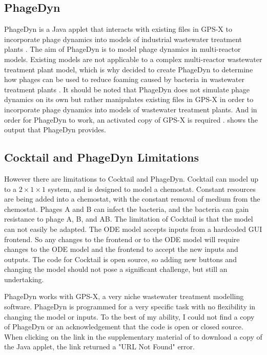 \subsection{PhageDyn}
PhageDyn is a Java applet that interacts with existing files in GPS-X \cite{AdvancedWastewaterModelling} to incorporate phage dynamics into models of industrial wastewater treatment plants \cite{krysiak-baltynSimulationPhageDynamics2017}. 
The aim of PhageDyn is to model phage dynamics in multi-reactor models. 
Existing models are not applicable to a complex multi-reactor wastewater treatment plant model, which is why \citet{krysiak-baltynSimulationPhageDynamics2017} decided to create PhageDyn to determine how phages can be used to reduce foaming caused by bacteria in wastewater treatment plants \cite{heardEffectFilamentousBacteria2008}. 
It should be noted that PhageDyn does not simulate phage dynamics on its own but rather manipulates existing files in GPS-X in order to incorporate phage dynamics into models of wastewater treatment plants. 
And in order for PhageDyn to work, an activated copy of GPS-X is required \cite{krysiak-baltynSimulationPhageDynamics2017}. 
 shows the output that PhageDyn provides. 

\subsection{Cocktail and PhageDyn Limitations}
However there are limitations to Cocktail and PhageDyn. 
Cocktail can model up to a $2\times 1 \times 1$ system, and is designed to model a chemostat. 
Constant resources are being added into a chemostat, with the constant removal of medium from the chemostat. 
Phages A and B can infect the bacteria, and the bacteria can gain resistance to phage A, B, and AB. 
The limitation of Cocktail is that the model can not easily be adapted. 
The ODE model accepts inputs from a hardcoded GUI frontend. 
So any changes to the frontend or to the ODE model will require changes to the ODE model and the frontend to accept the new inputs and outputs. 
The code for Cocktail is open source, so adding new buttons and changing the model should not pose a significant challenge, but still an undertaking. 

PhageDyn works with GPS-X, a very niche wastewater treatment modelling software. 
PhageDyn is programmed for a very specific task with no flexibility in changing the model or inputs. 
To the best of my ability, I could not find a copy of PhageDyn or an acknowledgement that the code is open or closed source. 
When clicking on the link in the supplementary material of \citet{krysiak-baltynSimulationPhageDynamics2017} to download a copy of the Java applet, the link returned a "URL Not Found" error. 

